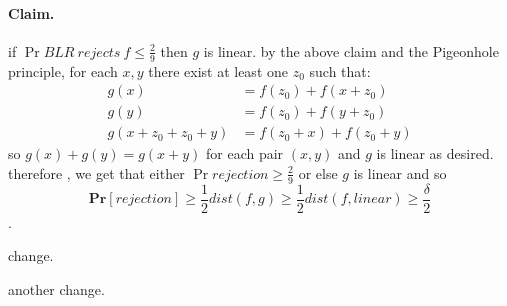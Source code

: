 \documentclass{article}
\begin{document}
\paragraph{ Claim.} if \( \Pr{ BLR \ rejects \ f  } \le \frac{2}{9} \) then \(g\) is linear. by the above claim and the Pigeonhole principle, for each \(x, y\) there exist at least one \(z_0 \) such that: \[
\begin{split}
    g(x) &= f(z_0) + f(x+z_0) \\
    g(y) &= f(z_0) + f(y+z_0) \\
    g(x+ z_0 + z_0 + y) &= f(z_0 +x) + f(z_0 + y) 
\end{split}\]
so \(g(x) + g(y) = g(x+y) \) for each pair \( (x,y) \) and \(g\) is linear as desired. therefore , we get that either \( \Pr{rejection} \ge \frac{2}{9} \) or else \( g \) is linear and so  
\[ \mathbf{Pr}[rejection] \ge \frac{1}{2} dist(f,g)  \ge \frac{1}{2} dist(f,linear) \ge \frac{\delta }{2}  \].  

change.

another change.
\end{document}
